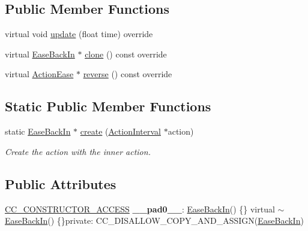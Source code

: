 \subsection*{Public Member Functions}
\begin{DoxyCompactItemize}
\item 
virtual void \hyperlink{classEaseBackIn_a6c053160bd8e0c98f23b1dd3acbc527c}{update} (float time) override
\item 
virtual \hyperlink{classEaseBackIn}{Ease\+Back\+In} $\ast$ \hyperlink{classEaseBackIn_a2f409b8e89fc64d521a6268ff701045d}{clone} () const override
\item 
virtual \hyperlink{classActionEase}{Action\+Ease} $\ast$ \hyperlink{classEaseBackIn_a79ac3292fef1c39370c668b99372b256}{reverse} () const override
\end{DoxyCompactItemize}
\subsection*{Static Public Member Functions}
\begin{DoxyCompactItemize}
\item 
static \hyperlink{classEaseBackIn}{Ease\+Back\+In} $\ast$ \hyperlink{classEaseBackIn_a3ea9ee4daccf7309a42c019f9cd40461}{create} (\hyperlink{classActionInterval}{Action\+Interval} $\ast$action)
\begin{DoxyCompactList}\small\item\em Create the action with the inner action. \end{DoxyCompactList}\end{DoxyCompactItemize}
\subsection*{Public Attributes}
\begin{DoxyCompactItemize}
\item 
\mbox{\label{classEaseBackIn_a1230ae326b203484862d7914dc5e1a34}} 
\hyperlink{_2cocos2d_2cocos_2base_2ccConfig_8h_a25ef1314f97c35a2ed3d029b0ead6da0}{C\+C\+\_\+\+C\+O\+N\+S\+T\+R\+U\+C\+T\+O\+R\+\_\+\+A\+C\+C\+E\+SS} {\bfseries \+\_\+\+\_\+pad0\+\_\+\+\_\+}\+: \hyperlink{classEaseBackIn}{Ease\+Back\+In}() \{\} virtual $\sim$\hyperlink{classEaseBackIn}{Ease\+Back\+In}() \{\}private\+: C\+C\+\_\+\+D\+I\+S\+A\+L\+L\+O\+W\+\_\+\+C\+O\+P\+Y\+\_\+\+A\+N\+D\+\_\+\+A\+S\+S\+I\+GN(\hyperlink{classEaseBackIn}{Ease\+Back\+In})
\end{DoxyCompactItemize}
